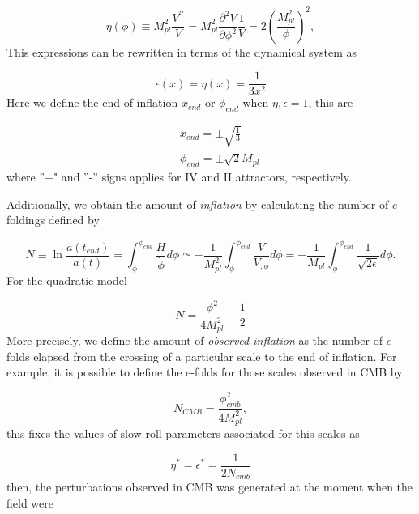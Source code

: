 \documentclass[12pt,letterpaper,twoside]{book}
\begin{document}
\begin{equation}
    \eta \left(\phi\right) \equiv M_{pl}^2 \frac{V^{\prime \prime}}{V}
        = M_{pl}^2 \frac{\partial^2 V}{\partial \phi^2} \frac{1}{V}
        =  2 \left( \frac{ M_{pl}^2 }{ \phi } \right)^2,
\end{equation}
This expressions can be rewritten in terms of the dynamical system as

\begin{equation}
    \epsilon(x)=\eta(x) = \frac{1}{3x^2}
\end{equation}
Here we define the end of inflation $x_{end}$ or $\phi_{end}$ when
$\eta,\epsilon=1$, this are

\begin{eqnarray}
    && x_{end}    = \pm \sqrt{ \frac{1}{3}}\\
    && \phi_{end} = \pm \sqrt{ 2} M_{pl}
\end{eqnarray}
where ''+" and ''-'' signs applies for IV and II attractors, respectively.

Additionally, we obtain the amount of \textit{inflation} by
calculating the number of $e$-foldings defined by

\begin{equation}
    N \equiv \ln \frac{a(t_{end})}{a(t)}
        =         \int_\phi^{\phi_{end} } \frac{H}{ \dot{\phi}} d\phi
        \simeq  - \frac{1}{ M_{pl}^2}\int_\phi^{\phi_{end} } \frac{V}{ V_{,\phi}} d\phi
        =       - \frac{1}{ M_{pl}} \int_\phi^{\phi_{end} } \frac{1}{ \sqrt{2
                \epsilon}} d\phi.
\end{equation}
For the quadratic model

\begin{equation}
    \boxed{N= \frac{ \phi^2 }{4 M_{pl}^2} - \frac{1}{2}}
\end{equation}
More precisely,  we define the amount of \textit{observed inflation} as the
number of $e$-folds elapsed from the crossing of a particular scale to the
end of inflation. For example, it is possible to define the e-folds for those
scales observed in CMB by

\begin{equation}
N_{CMB}= \frac{ \phi_{cmb}^2 }{4 M_{pl}^2},
\end{equation}
this fixes the values of slow roll parameters associated for this scales as 

\begin{equation}
\eta^* = \epsilon^* = \frac{1}{2N_{cmb}}
\end{equation}
then, the perturbations observed in CMB was generated at the moment when the
field were
\end{document}
